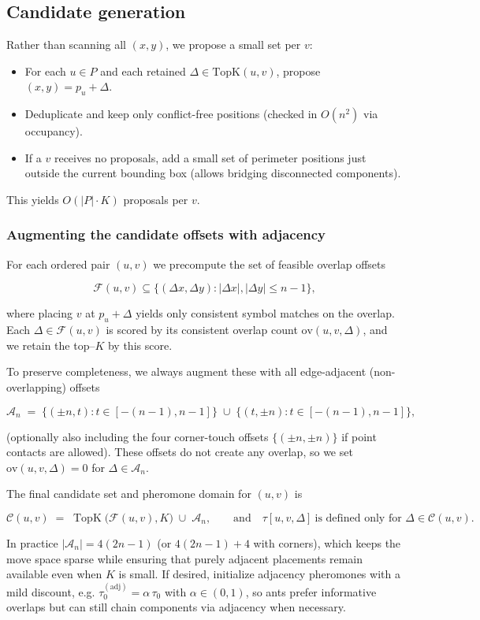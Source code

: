 \documentclass[11pt]{article}
\begin{document}
\subsection{Candidate generation}
Rather than scanning all $(x,y)$, we propose a small set per $v$:
\begin{itemize}
  \item For each $u\in P$ and each retained $\Delta\in\mathrm{TopK}(u,v)$, propose $(x,y)=p_u+\Delta$.
  \item Deduplicate and keep only conflict-free positions (checked in $O(n^2)$ via occupancy).
  \item If a $v$ receives no proposals, add a small set of perimeter positions just outside the current bounding box (allows bridging disconnected components).
\end{itemize}
This yields $O(|P|\cdot K)$ proposals per $v$.

\subsubsection{Augmenting the candidate offsets with adjacency}
For each ordered pair $(u,v)$ we precompute the set of feasible overlap offsets

$$
\mathcal{F}(u,v)\subseteq\{(\Delta x,\Delta y):|\Delta x|,|\Delta y|\le n-1\},
$$

where placing $v$ at $p_u+\Delta$ yields only consistent symbol matches on the overlap. Each $\Delta\in\mathcal{F}(u,v)$ is scored by its consistent overlap count $\mathrm{ov}(u,v,\Delta)$, and we retain the top–$K$ by this score.

To preserve completeness, we always augment these with all edge-adjacent (non-overlapping) offsets

$$
\mathcal{A}_n \;=\; \{(\pm n,t): t\in[-(n-1),n-1]\}\;\cup\;\{(t,\pm n): t\in[-(n-1),n-1]\},
$$

(optionally also including the four corner-touch offsets $\{(\pm n,\pm n)\}$ if point contacts are allowed). These offsets do not create any overlap, so we set $\mathrm{ov}(u,v,\Delta)=0$ for $\Delta\in\mathcal{A}_n$.

The final candidate set and pheromone domain for $(u,v)$ is

$$
\mathcal{C}(u,v)\;=\;\operatorname{TopK}\big(\mathcal{F}(u,v),K\big)\;\cup\;\mathcal{A}_n,
\qquad
\text{and}\quad \tau[u,v,\Delta]\ \text{is defined only for }\Delta\in\mathcal{C}(u,v).
$$

In practice $|\mathcal{A}_n|=4(2n-1)$ (or $4(2n-1)+4$ with corners), which keeps the move space sparse while ensuring that purely adjacent placements remain available even when $K$ is small. If desired, initialize adjacency pheromones with a mild discount, e.g. $\tau_0^{(\mathrm{adj})}=\alpha\,\tau_0$ with $\alpha\in(0,1)$, so ants prefer informative overlaps but can still chain components via adjacency when necessary.
\end{document}
